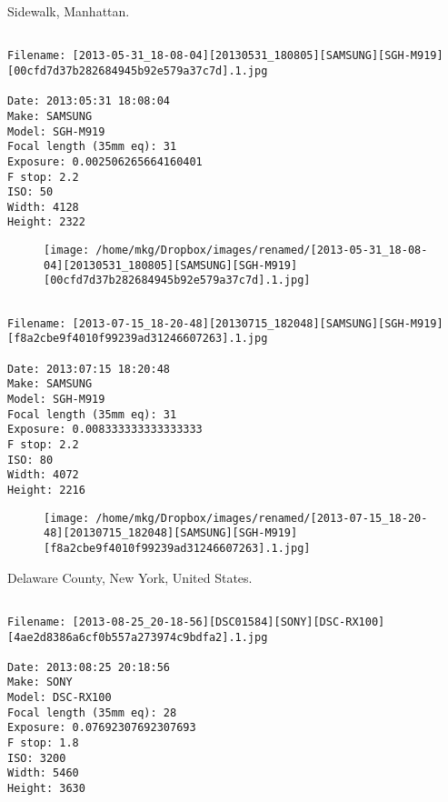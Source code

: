 \clearpage
\onecolumn
\noindent Sidewalk, Manhattan.
\noindent
\begin{lstlisting}

Filename: [2013-05-31_18-08-04][20130531_180805][SAMSUNG][SGH-M919][00cfd7d37b282684945b92e579a37c7d].1.jpg

Date: 2013:05:31 18:08:04
Make: SAMSUNG
Model: SGH-M919
Focal length (35mm eq): 31
Exposure: 0.002506265664160401
F stop: 2.2
ISO: 50
Width: 4128
Height: 2322
\end{lstlisting}
\clearpage

\begin{figure}
\texttt{[image: /home/mkg/Dropbox/images/renamed/[2013-05-31\_18-08-04][20130531\_180805][SAMSUNG][SGH-M919][00cfd7d37b282684945b92e579a37c7d].1.jpg]}
\end{figure}
    
\clearpage
\onecolumn
\noindent 
\noindent
\begin{lstlisting}

Filename: [2013-07-15_18-20-48][20130715_182048][SAMSUNG][SGH-M919][f8a2cbe9f4010f99239ad31246607263].1.jpg

Date: 2013:07:15 18:20:48
Make: SAMSUNG
Model: SGH-M919
Focal length (35mm eq): 31
Exposure: 0.008333333333333333
F stop: 2.2
ISO: 80
Width: 4072
Height: 2216
\end{lstlisting}
\clearpage

\begin{figure}
\texttt{[image: /home/mkg/Dropbox/images/renamed/[2013-07-15\_18-20-48][20130715\_182048][SAMSUNG][SGH-M919][f8a2cbe9f4010f99239ad31246607263].1.jpg]}
\end{figure}
    
\clearpage
\onecolumn
\noindent Delaware County, New York, United States.
\noindent
\begin{lstlisting}

Filename: [2013-08-25_20-18-56][DSC01584][SONY][DSC-RX100][4ae2d8386a6cf0b557a273974c9bdfa2].1.jpg

Date: 2013:08:25 20:18:56
Make: SONY
Model: DSC-RX100
Focal length (35mm eq): 28
Exposure: 0.07692307692307693
F stop: 1.8
ISO: 3200
Width: 5460
Height: 3630
\end{lstlisting}
\clearpage


